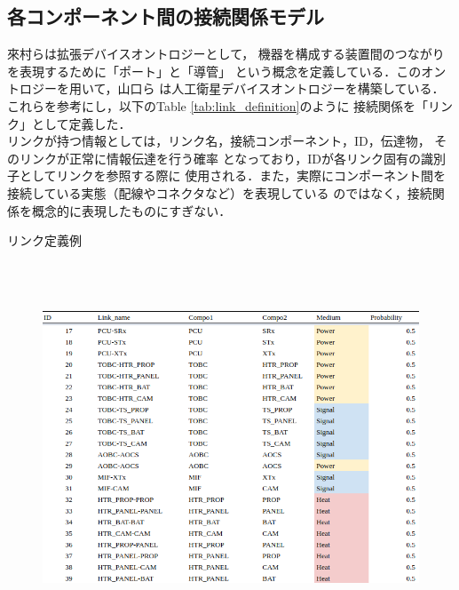 \documentclass[11pt]{jsreport}
\begin{document}
\subsection{各コンポーネント間の接続関係モデル}
來村ら\cite{Kitamura01}は拡張デバイスオントロジーとして，
機器を構成する装置間のつながりを表現するために「ポート」と「導管」%
という概念を定義している．このオントロジーを用いて，山口ら\cite{Yamaguchi2014}
は人工衛星デバイスオントロジーを構築している．
これらを参考にし，以下のTable \ref{tab:link_definition}のように
接続関係を「リンク」として定義した．\\%
リンクが持つ情報としては，リンク名，接続コンポーネント，ID，伝達物，
そのリンクが正常に情報伝達を行う確率%
となっており，IDが各リンク固有の識別子としてリンクを参照する際に
使用される．また，実際にコンポーネント間を接続している実態（配線やコネクタなど）を表現している
のではなく，接続関係を概念的に表現したものにすぎない．

\begin{table}[H]
   \centering
   \caption{リンク定義例}
   \label{tab:link_definition}
\end{table} 
\vspace{-2zh}
\begin{figure}[H]
   \centering
      \includegraphics[height=11cm]{figure/link_definition.png}
\end{figure}
\end{document}
